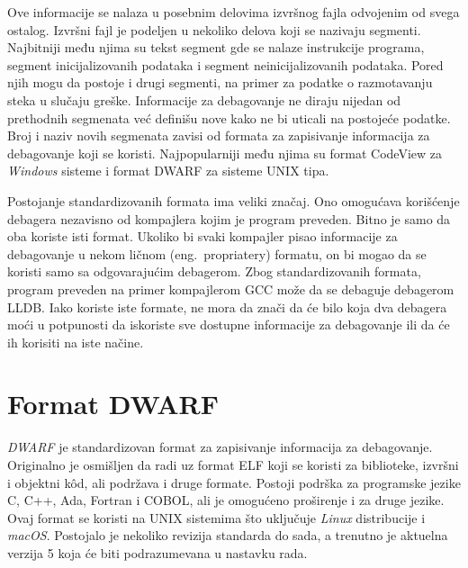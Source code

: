 \documentclass[12pt,oneside]{memoir}
\begin{document}
Ove informacije se nalaza u posebnim delovima izvršnog fajla odvojenim od svega ostalog.
Izvršni fajl je podeljen u nekoliko delova koji se nazivaju segmenti.
Najbitniji među njima su tekst segment gde se nalaze instrukcije programa, segment inicijalizovanih podataka i segment neinicijalizovanih podataka.
Pored njih mogu da postoje i drugi segmenti, na primer za podatke o razmotavanju steka u slučaju greške.
Informacije za debagovanje ne diraju nijedan od prethodnih segmenata već definišu nove kako ne bi uticali na postojeće podatke.
Broj i naziv novih segmenata zavisi od formata za zapisivanje informacija za debagovanje koji se koristi.
Najpopularniji među njima su format CodeView za \textit{Windows} sisteme i format DWARF za sisteme UNIX tipa.

Postojanje standardizovanih formata ima veliki značaj.
Ono omogućava korišćenje debagera nezavisno od kompajlera kojim je program preveden.
Bitno je samo da oba koriste isti format.
Ukoliko bi svaki kompajler pisao informacije za debagovanje u nekom ličnom (eng.~{propriatery}) formatu, on bi mogao da se koristi samo sa odgovarajućim debagerom.
Zbog standardizovanih formata, program preveden na primer kompajlerom GCC može da se debaguje debagerom LLDB.
Iako koriste iste formate, ne mora da znači da će bilo koja dva debagera moći u potpunosti da iskoriste sve dostupne informacije za debagovanje ili da će ih korisiti na iste načine.

\section{Format DWARF}
\label{sec:dwarf}


\textit{DWARF} je standardizovan format za zapisivanje informacija za debagovanje.
Originalno je osmišljen da radi uz format ELF koji se koristi za biblioteke, izvršni i objektni k\^od, ali podržava i druge formate.
Postoji podrška za programske jezike C, C++, Ada, Fortran i COBOL, ali je omogućeno proširenje i za druge jezike.
Ovaj format se koristi na UNIX sistemima što uključuje \textit{Linux} distribucije i \textit{macOS}.
Postojalo je nekoliko revizija standarda do sada, a trenutno je aktuelna verzija 5 koja će biti podrazumevana u nastavku rada.
\end{document}
